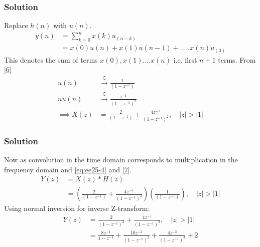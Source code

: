\documentclass{beamer}
\providecommand{\brak}[1]{\ensuremath{\left(#1\right)}}
\theoremstyle{remark}
\providecommand{\abs}[1]{\left\vert#1\right\vert}
\begin{document}
\begin{frame}
\frametitle{Solution}
Replace $h\brak{n}$ with $u\brak{n}$.
\begin{align}
    y\brak{n} &= \sum_{k=0}^{n} x(k)u_{\brak{n-k}}\\
    &=x(0)u\brak{n} + x(1)u\brak{n-1} + ..... x(n)u_{\brak{0}}
\end{align}
    This denotes the sum of terms $x(0),x(1)....x(n)$ i.e. first $n+1$ terms. From \eqref{6}\\
\begin{align}
    u\brak{n} &\xrightarrow{\mathcal{Z}} \frac{1}{\brak{1-z^{-1}}} \label{7}\\
nu\brak{n} &\xrightarrow{\mathcal{Z}} \frac{z^{-1}}{\brak{1-z^{-1}}^{2}}\\
  \implies  X(z)&= \frac{2}{\brak{1-z^{-1}}} + \frac{4z^{-1}}{\brak{1-z^{-1}}^{2}} \label{eq:ee25-4}
,\quad \abs {z}>\abs{1} 
\end{align}
\end{frame}





\begin{frame}
\frametitle{Solution}
Now as convolution in the time domain corresponds to multiplication in the frequency domain and \eqref{eq:ee25-4} and \eqref{7}.
\begin{align}
    Y\brak{z} &= X\brak{z} * H\brak{z}\\
 &= \brak{\frac{2}{\brak{1-z^{-1}}} +
\frac{4z^{-1}}{\brak{1-z^{-1}}^{2}}}\brak{\frac{1}{\brak{1-z^{-1}}}}
,\quad \abs {z}>\abs{1}     
\end{align}
Using normal inversion for inverse Z-transform:
\begin{align}
 Y(z) &= \frac{2}{\brak{1-z^{-1}}^2} +
\frac{4z^{-1}}{\brak{1-z^{-1}}^{3}}
,\quad \abs {z}>\abs{1}\\
   &= \frac{8z^{-1}}{1-z^{-1}} + \frac{10z^{-2}}{\brak{1-z^{-1}}^2} + \frac{4z^{-3}}{\brak{1-z^{-1}}^{3}} + 2\label{final}
\end{align}
    
\end{frame}
\end{document}
